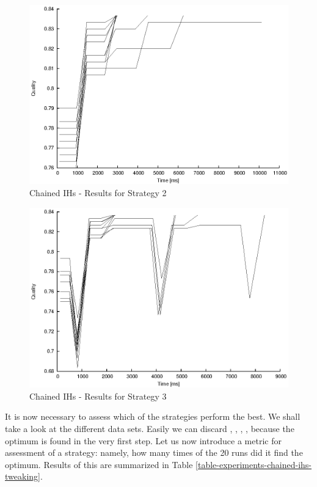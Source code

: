 \begin{figure}
  \caption{Chained IHs -  Results for Strategy 2}
  \label{image-experiment-chained-ihs-s2}
  \centering
    \includegraphics[width=\textwidth]{images/experiments/chained-ihs-s2}
\end{figure}

\begin{figure}
  \caption{Chained IHs -  Results for Strategy 3}
  \label{image-experiment-chained-ihs-s3}
  \centering
    \includegraphics[width=\textwidth]{images/experiments/chained-ihs-s3}
\end{figure}

It is now necessary to assess which of the strategies perform the best. We shall take a look at the different data sets. Easily we can discard , , , , because the optimum is found in the very first step. Let us now introduce a metric for assessment of a strategy: namely, how many times of the 20 runs did it find the optimum. Results of this are summarized in Table \ref{table-experiments-chained-ihs-tweaking}.

